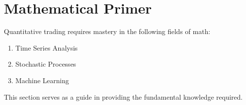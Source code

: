 \section{Mathematical Primer}

Quantitative trading requires mastery in the following fields of math:
\begin{enumerate}[label=\roman*.]
\setlength{\itemsep}{0pt}
\item Time Series Analysis
\item Stochastic Processes
\item Machine Learning
\end{enumerate}

This section serves as a guide in providing the fundamental knowledge required.



\newpage



\newpage



